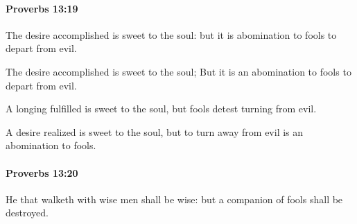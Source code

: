 		\paragraph{Proverbs 13:19} %
			\label{PROVERBS-13-19}

			The desire accomplished is sweet to the soul: but it is abomination to fools to depart from evil.

			\begin{versebox}
					\item[BHS] 
					\item[ASV] The desire accomplished is sweet to the soul; But it is an abomination to fools to depart from evil.
					\item[NIV] A longing fulfilled is sweet to the soul, but fools detest turning from evil.
					\item[NRSV] A desire realized is sweet to the soul, but to turn away from evil is an abomination to fools.
			\end{versebox}

		\paragraph{Proverbs 13:20} %
			\label{PROVERBS-13-20}

			He that walketh with wise men shall be wise: but a companion of fools shall be destroyed.

